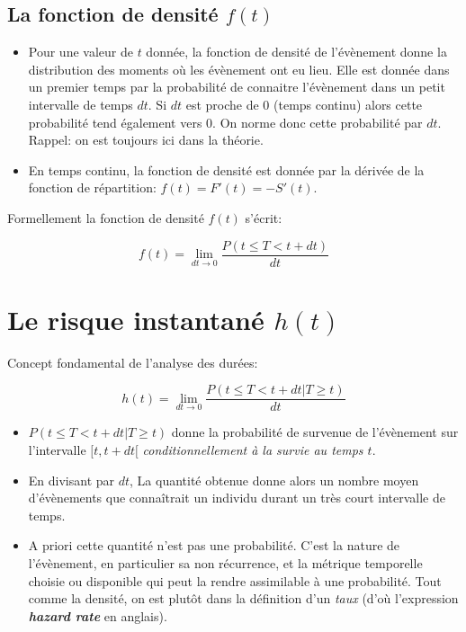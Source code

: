 \documentclass[
  12pt,
  letterpaper,
  DIV=11,
  numbers=noendperiod,
  onepage,
  openany]{scrreprt}
\providecommand{\tightlist}{%
  \setlength{\itemsep}{0pt}\setlength{\parskip}{0pt}}\usepackage{longtable,booktabs,array}
\begin{document}
\hypertarget{la-fonction-de-densituxe9-ft}{%
\subsection{\texorpdfstring{La fonction de densité
\(f(t)\)}{La fonction de densité f(t)}}\label{la-fonction-de-densituxe9-ft}}

\begin{itemize}
\tightlist
\item
  Pour une valeur de \(t\) donnée, la fonction de densité de l'évènement
  donne la distribution des moments où les évènement ont eu lieu. Elle
  est donnée dans un premier temps par la probabilité de connaitre
  l'évènement dans un petit intervalle de temps \(dt\). Si \(dt\) est
  proche de 0 (temps continu) alors cette probabilité tend également
  vers 0. On norme donc cette probabilité par \(dt\). Rappel: on est
  toujours ici dans la théorie.\\
\item
  En temps continu, la fonction de densité est donnée par la dérivée de
  la fonction de répartition: \(f(t)=F'(t)=-S'(t)\).
\end{itemize}

Formellement la fonction de densité \(f(t)\) s'écrit:

\[f(t)=\lim\limits_{dt\to{0}}  \frac{P(t\leq{T}< t + dt)}{dt}\]

\hypertarget{le-risque-instantanuxe9-ht}{%
\section{\texorpdfstring{Le risque instantané
\(h(t)\)}{Le risque instantané h(t)}}\label{le-risque-instantanuxe9-ht}}

Concept fondamental de l'analyse des durées:

\[h(t)=\lim\limits_{dt\to{0}} \frac{P(t\leq{T}< t + dt | T\geq{t})}{dt}\]

\begin{itemize}
\tightlist
\item
  \(P(t\leq{T}< t + dt | T\geq{t})\) donne la probabilité de survenue de
  l'évènement sur l'intervalle \([t,t+dt[\) \emph{conditionnellement à
  la survie au temps \(t\)}.\\
\item
  En divisant par \(dt\), La quantité obtenue donne alors un nombre
  moyen d'évènements que connaîtrait un individu durant un très court
  intervalle de temps.
\item
  A priori cette quantité n'est pas une probabilité. C'est la nature de
  l'évènement, en particulier sa non récurrence, et la métrique
  temporelle choisie ou disponible qui peut la rendre assimilable à une
  probabilité. Tout comme la densité, on est plutôt dans la définition
  d'un \emph{taux} (d'où l'expression \textbf{\emph{hazard rate}} en
  anglais).
\end{itemize}
\end{document}
